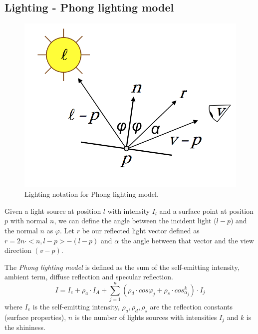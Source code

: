 
\subsection{Lighting - Phong lighting model}

\begin{figure}[h!]
  \centering
  \includegraphics[scale=0.6]{images/lighting}
\caption{Lighting notation for Phong lighting model. \cite{SLIDE:ICORSI}}
\end{figure}
Given a light source at position $l$ with intensity $I_l$ and a surface point at position $p$ with normal $n$,
we can define the angle between the incident light ($l-p$) and the normal $n$ as $\varphi$.
Let $r$ be our reflected light vector defined as $r = 2 n \cdot <n, l - p> - (l-p)$ and $\alpha$ the angle between that vector and the view direction $(v - p)$.

The \textit{Phong lighting model} is defined as the sum of the self-emitting intensity, ambient term, diffuse reflection and specular reflection.
$$ I = I_e + {\rho}_a \cdot I_A + \sum_{j=1}^n ({\rho}_d \cdot cos {\varphi}_j + {\rho}_s \cdot cos_{\alpha_j}^k) \cdot I_j$$ where $I_e$ is the self-emitting intensity, ${\rho}_a, {\rho}_d, {\rho}_s$ are the reflection constants (surface properties), $n$ is the number of lights sources with intensities $I_j$ and $k$ is the shininess.
\cite{SLIDE:ICORSI}


